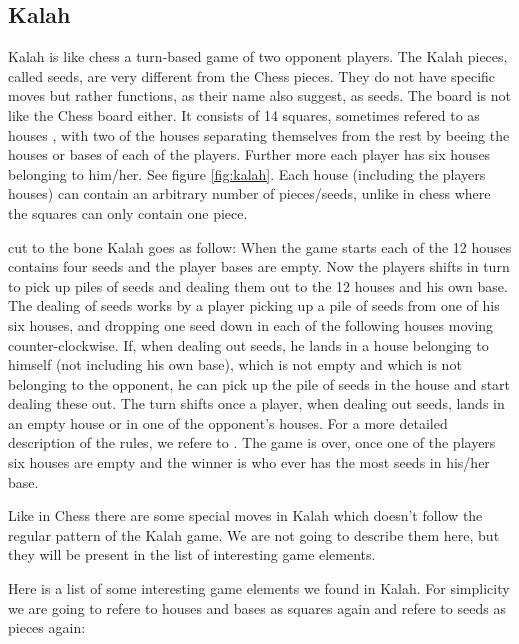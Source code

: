 \subsection{Kalah}

Kalah is like chess a turn-based game of two opponent players. The Kalah pieces, called seeds, are very different from the Chess pieces. They do not have specific moves but rather functions, as their name also suggest, as seeds. The board is not like the Chess board either. It consists of 14 squares, sometimes refered to as houses \cite{kalahrules}, with two of the houses separating themselves from the rest by beeing the houses or bases of each of the players. Further more each player has six houses belonging to him/her. See figure \ref{fig:kalah}. Each house (including the players houses) can contain an arbitrary number of pieces/seeds, unlike in chess where the squares can only contain one piece.  

cut to the bone Kalah goes as follow: When the game starts each of the 12 houses contains four seeds and the player bases are empty. Now the players shifts in turn to pick up piles of seeds and dealing them out to the 12 houses and his own base. The dealing of seeds works by a player picking up a pile of seeds from one of his six houses, and dropping one seed down in each of the following houses moving counter-clockwise. If, when dealing out seeds, he lands in a house belonging to himself (not including his own base), which is not empty and which is not belonging to the opponent, he can pick up the pile of seeds in the house and start dealing these out. The turn shifts once a player, when dealing out seeds, lands in an empty house or in one of the opponent's houses. For a more detailed description of the rules, we refere to \cite{kalahrules}. The game is over, once one of the players six houses are empty and the winner is who ever has the most seeds in his/her base.

Like in Chess there are some special moves in Kalah which doesn't follow the regular pattern of the Kalah game. We are not going to describe them here, but they will be present in the list of interesting game elements.   


Here is a list of some interesting game elements we found in Kalah. For simplicity we are going to refere to houses and bases as squares again and refere to seeds as pieces again:

